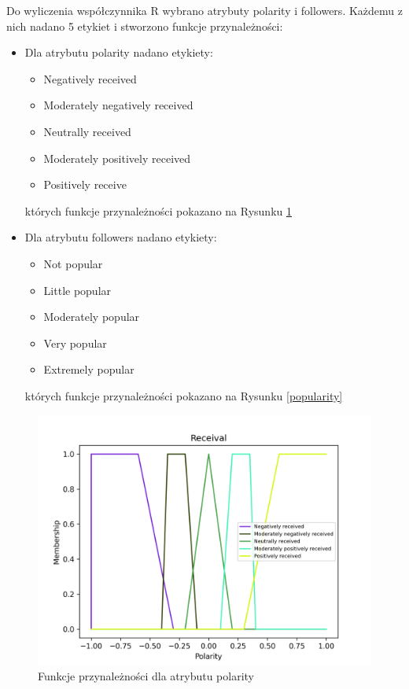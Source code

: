 \documentclass{classrep}
\begin{document}
Do wyliczenia współczynnika R wybrano atrybuty polarity i followers. Każdemu z nich nadano 5 etykiet i stworzono funkcje przynależności:

\begin{itemize}
    \item Dla atrybutu polarity nadano etykiety:
    \begin{itemize}
        \item Negatively received
        \item Moderately negatively received
        \item Neutrally received
        \item Moderately positively received
        \item Positively receive
    \end{itemize}
    których funkcje przynależności pokazano na Rysunku \ref{receival}
    \item Dla atrybutu followers nadano etykiety:
    \begin{itemize}
        \item Not popular
        \item Little popular
        \item Moderately popular
        \item Very popular
        \item Extremely popular
    \end{itemize}
    których funkcje przynależności pokazano na Rysunku \ref{popularity}
\end{itemize}

\begin{figure}[H]
    \centering
    \includegraphics[width=1\textwidth]{resources/stage3/Receival.png}
    \caption{Funkcje przynależności dla atrybutu polarity}
    \label{receival}
\end{figure}
\end{document}
